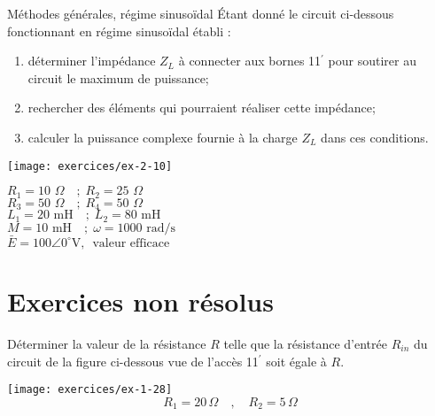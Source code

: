 \begin{exercise}{Méthodes générales, régime sinusoïdal}\label{ex:RSE-10}
	Étant donné le circuit ci-dessous fonctionnant en
	régime sinusoïdal établi :
	\begin{enumerate}
		\item déterminer l'impédance $Z_L$ à connecter aux bornes 11$^{'}$
		pour soutirer au circuit le maximum de puissance;
		\item rechercher des éléments qui pourraient réaliser cette impédance;
		\item calculer la puissance complexe fournie à la charge $Z_L$ dans
		ces conditions.
	\end{enumerate}
	
	\begin{minipage}[c]{5cm}
		\flushright \texttt{[image: exercices/ex-2-10]}\\
	\end{minipage}
	\begin{minipage}[c]{5cm}
		\begin{center}
			$R_1=10\mbox{~}\Omega \quad ; \; R_2=25\mbox{~}\Omega $\\
			$R_3=50\mbox{~}\Omega \quad ; \; R_4=50\mbox{~}\Omega $\\
			$L_1=20\mbox{~mH}\quad ; \; L_2=80\mbox{~mH}$\\
			$M=10\mbox{~mH}\quad ; \;
			\omega=1000 \mbox{~rad/s}$\\
			$\bar{E}=100\angle 0^{\circ} \mbox{V, ~valeur efficace}$
		\end{center}
	\end{minipage}
	
	
\end{exercise}


\section{Exercices non résolus}

\begin{exercise}{}\label{ex:mg-11}
	Déterminer la valeur de la résistance $R$  telle que la
	résistance d'entrée $R_{in}$ du circuit de la  figure ci-dessous vue de l'accès
	11$^{'}$ soit égale à $R$.
	\begin{center}
		\texttt{[image: exercices/ex-1-28]}
		\[R_1=20\, \Omega \quad , \quad R_2=5\, \Omega\]
	\end{center}
	
\end{exercise}


